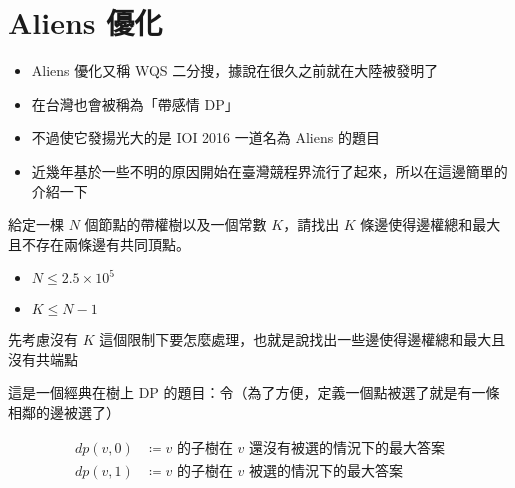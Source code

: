 \documentclass[standalone]{beamer}
\begin{document}
\section{Aliens 優化}

\begin{frame}{}
  \begin{itemize}
    \item Aliens 優化又稱 WQS 二分搜，據說在很久之前就在大陸被發明了
    \item 在台灣也會被稱為「帶感情 DP」
    \item 不過使它發揚光大的是 IOI 2016 一道名為 Aliens 的題目
    \item 近幾年基於一些不明的原因開始在臺灣競程界流行了起來，所以在這邊簡單的介紹一下
  \end{itemize}
\end{frame}

\begin{frame}{}
  \begin{problem}
    給定一棵 $N$ 個節點的帶權樹以及一個常數 $K$，請找出 $K$ 條邊使得邊權總和最大且不存在兩條邊有共同頂點。

    \begin{itemize}
      \item $N \leq 2.5 \times 10^5$
      \item $K \leq N - 1$
    \end{itemize}
  \end{problem}
\end{frame}

\begin{frame}{}
  先考慮沒有 $K$ 這個限制下要怎麼處理，也就是說找出一些邊使得邊權總和最大且沒有共端點
  
  這是一個經典在樹上 DP 的題目：令（為了方便，定義一個點被選了就是有一條相鄰的邊被選了）

  \begin{align*}
    dp(v, 0) &\coloneqq \text{$v$ 的子樹在 $v$ 還沒有被選的情況下的最大答案} \\
    dp(v, 1) &\coloneqq \text{$v$ 的子樹在 $v$ 被選的情況下的最大答案} \\
  \end{align*} 
\end{frame}
\end{document}
